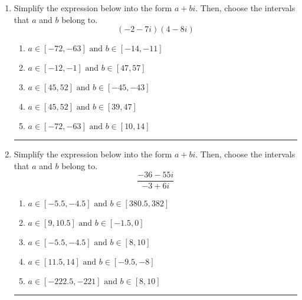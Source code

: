 \documentclass[14pt]{extbook}
\newcommand{\litem}[1]{\item#1\hspace*{-1cm}\rule{\textwidth}{0.4pt}}
\begin{document}
\begin{enumerate}
{\begin{enumerate}[label=\Alph*.]
\end{enumerate} }
\litem{
Simplify the expression below into the form $a+bi$. Then, choose the intervals that $a$ and $b$ belong to.\[ (-2 - 7 i)(4 - 8 i) \]\begin{enumerate}[label=\Alph*.]
\item \( a \in [-72, -63] \text{ and } b \in [-14, -11] \)
\item \( a \in [-12, -1] \text{ and } b \in [47, 57] \)
\item \( a \in [45, 52] \text{ and } b \in [-45, -43] \)
\item \( a \in [45, 52] \text{ and } b \in [39, 47] \)
\item \( a \in [-72, -63] \text{ and } b \in [10, 14] \)

\end{enumerate} }
\litem{
Simplify the expression below into the form $a+bi$. Then, choose the intervals that $a$ and $b$ belong to.\[ \frac{-36 - 55 i}{-3 + 6 i} \]\begin{enumerate}[label=\Alph*.]
\item \( a \in [-5.5, -4.5] \text{ and } b \in [380.5, 382] \)
\item \( a \in [9, 10.5] \text{ and } b \in [-1.5, 0] \)
\item \( a \in [-5.5, -4.5] \text{ and } b \in [8, 10] \)
\item \( a \in [11.5, 14] \text{ and } b \in [-9.5, -8] \)
\item \( a \in [-222.5, -221] \text{ and } b \in [8, 10] \)

\end{enumerate} }
\end{enumerate}
\end{document}
